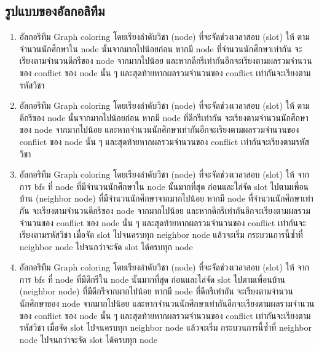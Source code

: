 \subsection{รูปแบบของอัลกอลิทึม}
\begin{enumerate}
  \item อัลกอริทึม Graph coloring โดยเรียงลำดับวิชา (node) ที่จะจัดช่วงเวลาสอบ (slot) ให้ ตามจำนวนนักศึกษาใน node นั้นจากมากไปน้อยก่อน
  หากมี node ที่จำนวนนักศึกษาเท่ากัน จะเรียงตามจำนวนดีกรีของ node จากมากไปน้อย และหากดีกรีเท่ากันอีกจะเรียงตามผลรวมจำนวนของ conflict ของ node นั้น ๆ 
  และสุดท้ายหากผลรวมจำนวนของ conflict เท่ากันจะเรียงตามรหัสวิชา
  \item อัลกอริทึม Graph coloring โดยเรียงลำดับวิชา (node) ที่จะจัดช่วงเวลาสอบ (slot) ให้ ตามดีกรีของ node นั้นจากมากไปน้อยก่อน
  หากมี node ที่ดีกรีเท่ากัน จะเรียงตามจำนวนนักศึกษาของ node จากมากไปน้อย และหากจำนวนนักศึกษาเท่ากันอีกจะเรียงตามผลรวมจำนวนของ conflict ของ node นั้น ๆ 
  และสุดท้ายหากผลรวมจำนวนของ conflict เท่ากันจะเรียงตามรหัสวิชา
  \item อัลกอริทึม Graph coloring โดยเรียงลำดับวิชา (node) ที่จะจัดช่วงเวลาสอบ (slot) ให้ จากการ bfs ที่ node ที่มีจำนวนนักศึกษาใน node นั้นมากที่สุด
  ก่อนและไล่จัด slot ไปตามเพื่อนบ้าน (neighbor node) ที่มีจำนวนนักศึกษาจากมากไปน้อย หากมี node ที่จำนวนนักศึกษาเท่ากัน จะเรียงตามจำนวนดีกรีของ node จากมากไปน้อย และหากดีกรีเท่ากันอีกจะเรียงตามผลรวมจำนวนของ conflict ของ node นั้น ๆ 
  และสุดท้ายหากผลรวมจำนวนของ conflict เท่ากันจะเรียงตามรหัสวิชา เมื่อจัด slot ไปจนครบทุก neighbor node แล้วจะเริ่ม กระบวนการนี้ซ้ำที่ neighbor node ไปจนกว่าจะจัด slot ได้ครบทุก node
  \item อัลกอริทึม Graph coloring โดยเรียงลำดับวิชา (node) ที่จะจัดช่วงเวลาสอบ (slot) ให้ จากการ bfs ที่ node ที่มีดีกรีใน node นั้นมากที่สุด
  ก่อนและไล่จัด slot ไปตามเพื่อนบ้าน (neighbor node) ที่มีดีกรีจากมากไปน้อย หากมี node ที่ดีกรีเท่ากัน จะเรียงตามจำนวนนักศึกษาของ node จากมากไปน้อย และหากจำนวนนักศึกษาเท่ากันอีกจะเรียงตามผลรวมจำนวนของ conflict ของ node นั้น ๆ 
  และสุดท้ายหากผลรวมจำนวนของ conflict เท่ากันจะเรียงตามรหัสวิชา เมื่อจัด slot ไปจนครบทุก neighbor node แล้วจะเริ่ม กระบวนการนี้ซ้ำที่ neighbor node ไปจนกว่าจะจัด slot ได้ครบทุก node
\end{enumerate}

